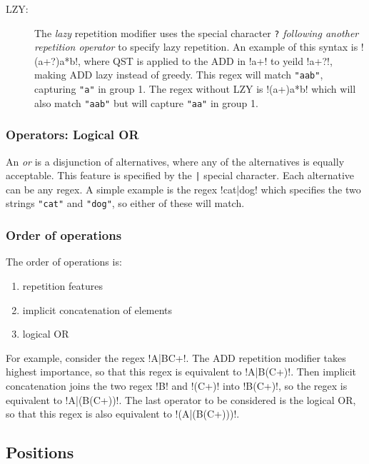 \begin{description}
\item[LZY:] The \emph{lazy} repetition modifier uses the special character \verb!?! \emph{following another repetition operator} to specify lazy repetition.  An example of this syntax is \cverb!(a+?)a*b!, where QST is applied to the ADD in \cverb!a+! to yeild \cverb!a+?!, making ADD lazy instead of greedy.  This regex will match \verb!"aab"!, capturing \verb!"a"! in group 1.  The regex without LZY is \cverb!(a+)a*b! which will also match \verb!"aab"! but will capture \verb!"aa"! in group 1.
\end{description}

\subsubsection{Operators: Logical OR}
\begin{description} \itemsep -1pt
\item[OR:] An \emph{or} is a disjunction of alternatives, where any of the alternatives is equally acceptable.  This feature is specified by the \verb!|! special character.  Each alternative can be any regex.  A simple example is the regex \cverb!cat|dog! which specifies the two strings \verb!"cat"! and \verb!"dog"!, so either of these will match.
\end{description}

\subsubsection{Order of operations}
\label{sec:orderOfOperations}
The order of operations is:
\begin{enumerate}\itemsep -1pt
\item repetition features
\item implicit concatenation of elements
\item logical OR
\end{enumerate}
For example, consider the regex \cverb!A|BC+!.  The ADD repetition modifier takes highest importance, so that this regex is equivalent to \cverb!A|B(C+)!.  Then implicit concatenation joins the two regex \cverb!B! and \cverb!(C+)! into \cverb!B(C+)!, so the regex is equivalent to \cverb!A|(B(C+))!.  The last operator to be considered is the logical OR, so that this regex is also equivalent to \cverb!(A|(B(C+)))!.

\subsection{Positions}


